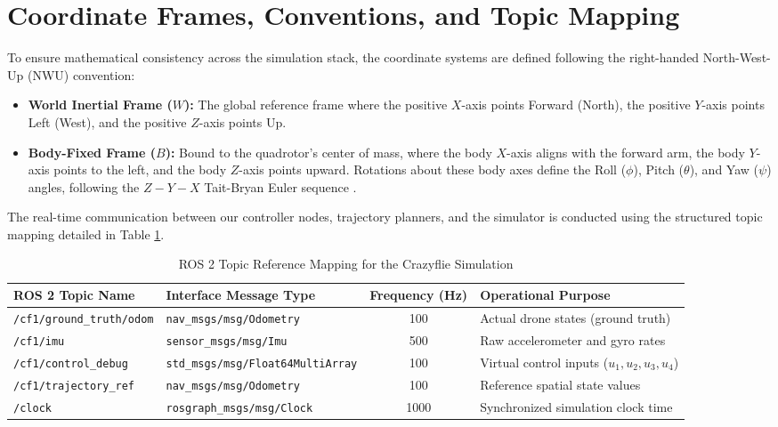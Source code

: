 \section{Coordinate Frames, Conventions, and Topic Mapping}
To ensure mathematical consistency across the simulation stack, the coordinate systems are defined following the right-handed North-West-Up (NWU) convention:
\begin{itemize}
    \item \textbf{World Inertial Frame ($W$):} The global reference frame where the positive $X$-axis points Forward (North), the positive $Y$-axis points Left (West), and the positive $Z$-axis points Up.
    \item \textbf{Body-Fixed Frame ($B$):} Bound to the quadrotor's center of mass, where the body $X$-axis aligns with the forward arm, the body $Y$-axis points to the left, and the body $Z$-axis points upward. Rotations about these body axes define the Roll ($\phi$), Pitch ($\theta$), and Yaw ($\psi$) angles, following the $Z-Y-X$ Tait-Bryan Euler sequence \cite{ref_94}.
\end{itemize}

The real-time communication between our controller nodes, trajectory planners, and the simulator is conducted using the structured topic mapping detailed in Table \ref{tab:ros2_topics}.

\begin{table}[h!]
\centering
\caption{ROS 2 Topic Reference Mapping for the Crazyflie Simulation}
\label{tab:ros2_topics}
\begin{tabular}{|l|l|c|l|}
\hline
\textbf{ROS 2 Topic Name} & \textbf{Interface Message Type} & \textbf{Frequency (Hz)} & \textbf{Operational Purpose} \\
\hline
\texttt{/cf1/ground\_truth/odom} & \texttt{nav\_msgs/msg/Odometry} & 100 & Actual drone states (ground truth) \\
\texttt{/cf1/imu} & \texttt{sensor\_msgs/msg/Imu} & 500 & Raw accelerometer and gyro rates \\
\texttt{/cf1/control\_debug} & \texttt{std\_msgs/msg/Float64MultiArray} & 100 & Virtual control inputs ($u_1, u_2, u_3, u_4$) \\
\texttt{/cf1/trajectory\_ref} & \texttt{nav\_msgs/msg/Odometry} & 100 & Reference spatial state values \\
\texttt{/clock} & \texttt{rosgraph\_msgs/msg/Clock} & 1000 & Synchronized simulation clock time \\
\hline
\end{tabular}
\end{table}

